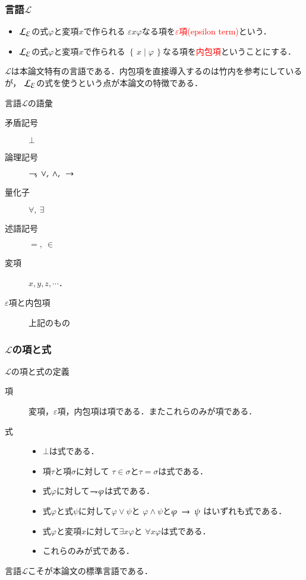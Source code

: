 \documentclass[dvipdfmx,10pt,notheorems]{beamer}
\theoremstyle{definition}
\newcommand{\lang}[1]{\mathcal{L}_{\scalebox{1.2}{$#1$}}} %
\newcommand{\Set}[2]{\left\{\, #1 \mid #2\, \right\}} %
\newcommand{\negation}{\rightharpoondown\hspace{-0.25em}} %
\newcommand{\rarrow}{\hspace{0.25em}\rightarrow\hspace{0.25em}} %
\begin{document}
\begin{frame}\frametitle{言語$\mathcal{L}$}
	\begin{itemize}
		\item $\lang{\varepsilon}$の式$\varphi$と変項$x$で作られる
			$\varepsilon x \varphi$なる項を\textcolor{red}{$\varepsilon$項(epsilon term)}という．
			
		\item $\lang{\varepsilon}$の式$\varphi$と変項$x$で作られる
			$\Set{x}{\varphi}$なる項を\textcolor{red}{内包項}ということにする．
	\end{itemize}
	
	$\mathcal{L}$は本論文特有の言語である．内包項を直接導入するのは竹内\cite{TakeuchiSet}を参考にしているが，
	$\lang{\varepsilon}$の式を使うという点が本論文の特徴である．
	
	\begin{exampleblock}{言語$\mathcal{L}$の語彙}
		\begin{description}
			\item[矛盾記号] $\bot$
			\item[論理記号] $\negation,\ \vee,\ \wedge,\ \rarrow$
			\item[量化子] $\forall,\ \exists$
			\item[述語記号] $=,\ \in$
			\item[変項] $x,y,z,\cdots$．
			\item[$\varepsilon$項と内包項] 上記のもの 
		\end{description}
	\end{exampleblock}
\end{frame}

\begin{frame}\frametitle{$\mathcal{L}$の項と式}

	\begin{exampleblock}{$\mathcal{L}$の項と式の定義}
		\begin{description}
			\item[項] 変項，$\varepsilon$項，内包項は項である．またこれらのみが項である．
			
			\item[式] 
				\begin{itemize}
					\item $\bot$は式である．
					\item 項$\tau$と項$\sigma$に対して
						$\tau \in \sigma$と$\tau = \sigma$は式である．
					\item 式$\varphi$に対して$\negation \varphi$は式である．
					\item 式$\varphi$と式$\psi$に対して$\varphi \vee \psi$と
						$\varphi \wedge \psi$と$\varphi \rarrow \psi$
						はいずれも式である．
					\item 式$\varphi$と変項$x$に対して$\exists x \varphi$と
						$\forall x \varphi$は式である．
					\item これらのみが式である．
				\end{itemize}
		\end{description}
	\end{exampleblock}
	
	言語$\mathcal{L}$こそが本論文の標準言語である．
	
\end{frame}
\end{document}
